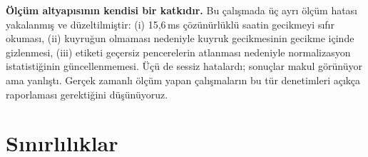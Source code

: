 \documentclass[conference]{IEEEtran}
\newcommand{\ms}{\,ms\xspace}
\begin{document}
\textbf{Ölçüm altyapısının kendisi bir katkıdır.} Bu çalışmada üç ayrı ölçüm
hatası yakalanmış ve düzeltilmiştir: (i) 15{,}6\ms çözünürlüklü saatin gecikmeyi
sıfır okuması, (ii) kuyruğun olmaması nedeniyle kuyruk gecikmesinin gecikme
içinde gizlenmesi, (iii) etiketi geçersiz pencerelerin atlanması nedeniyle
normalizasyon istatistiğinin güncellenmemesi. Üçü de sessiz hatalardı; sonuçlar
makul görünüyor ama yanlıştı. Gerçek zamanlı ölçüm yapan çalışmaların bu tür
denetimleri açıkça raporlaması gerektiğini düşünüyoruz.

\section{Sınırlılıklar}
\end{document}
